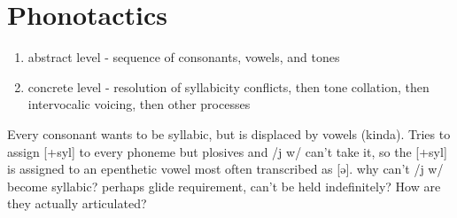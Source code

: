 \documentclass[smallroyalvopaper,9pt]{memoir}
\begin{document}

\section{Phonotactics}

\begin{enumerate}
    \item abstract level - sequence of consonants, vowels, and tones
    \item concrete level - resolution of syllabicity conflicts, then tone collation, then intervocalic voicing, then other processes
\end{enumerate}

Every consonant wants to be syllabic, but is displaced by vowels (kinda).
Tries to assign [+syl] to every phoneme but plosives and /j w/ can't take it, so the [+syl] is assigned to an epenthetic vowel most often transcribed as [ə]. why can't /j w/ become syllabic? perhaps glide requirement, can't be held indefinitely? How are they actually articulated? 
\end{document}
